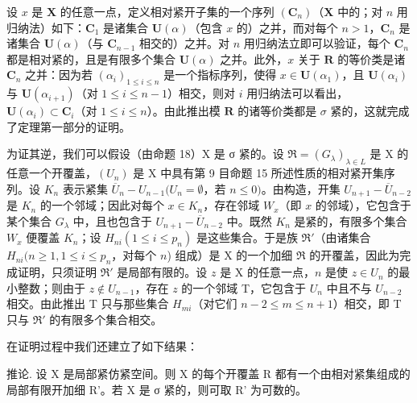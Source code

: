 设 \(x\) 是 \(\mathbf{X}\) 的任意一点，定义相对紧开子集的一个序列 \((\mathbf{C}_n)\)（\(\mathbf{X}\) 中的；对 \(n\) 用归纳法）如下：\(\mathbf{C}_1\) 是诸集合 \(\mathbf{U}(\alpha)\)（包含 \(x\) 的）之并，而对每个 \(n > 1\)，\(\mathbf{C}_n\) 是诸集合 \(\mathbf{U}(\alpha)\)（与 \(\mathbf{C}_{n-1}\) 相交的）之并。对 \(n\) 用归纳法立即可以验证，每个 \(\mathbf{C}_n\) 都是相对紧的，且是有限多个集合 \(\mathbf{U}(\alpha)\) 之并。此外，\(x\) 关于 \(\mathbf{R}\) 的等价类是诸 \(\mathbf{C}_n\) 之并：因为若 \((\alpha_i)_{1 \leqslant i \leqslant n}\) 是一个指标序列，使得 \(x \in \mathbf{U}(\alpha_1)\)，且 \(\mathbf{U}(\alpha_i)\) 与 \(\mathbf{U}(\alpha_{i+1})\)（对 \(1 \leqslant i \leqslant n - 1\)）相交，则对 \(i\) 用归纳法可以看出，\(\mathbf{U}(\alpha_i) \subset \mathbf{C}_i\)（对 \(1 \leqslant i \leqslant n\)）。由此推出模 \(\mathbf{R}\) 的诸等价类都是 \(\sigma\) 紧的，这就完成了定理第一部分的证明。

为证其逆，我们可以假设（由命题 18）X 是 σ 紧的。设 \(\Re = (G_{\lambda})_{\lambda \in L}\) 是 X 的任意一个开覆盖，\((U_n)\) 是 X 中具有第 9 目命题 15 所述性质的相对紧开集序列。设 \(K_n\) 表示紧集 \(\overline{U}_n - U_{n-1}(U_n = \emptyset\)，若 \(n \leqslant 0)\)。由构造，开集 \(U_{n+1} - \overline{U}_{n-2}\) 是 \(K_n\) 的一个邻域；因此对每个 \(x \in K_n\)，存在邻域 \(W_x\)（即 \(x\) 的邻域），它包含于某个集合 \(G_{\lambda}\) 中，且也包含于 \(U_{n+1} - \overline{U}_{n-2}\) 中。既然 \(K_n\) 是紧的，有限多个集合 \(W_x\) 便覆盖 \(K_n\)；设 \(H_{ni}(1 \leqslant i \leqslant p_n)\) 是这些集合。于是族 \(\Re'\)（由诸集合 \(H_{ni}(n \geqslant 1, 1 \leqslant i \leqslant p_n\)，对每个 \(n\)) 组成）是 X 的一个加细 \(\Re\) 的开覆盖，因此为完成证明，只须证明 \(\Re'\) 是局部有限的。设 \(z\) 是 X 的任意一点，\(n\) 是使 \(z \in U_n\) 的最小整数；则由于 \(z \notin U_{n-1}\)，存在 \(z\) 的一个邻域 T，它包含于 \(U_n\) 中且不与 \(U_{n-2}\) 相交。由此推出 T 只与那些集合 \(H_{mi}\)（对它们 \(n - 2 \leqslant m \leqslant n + 1\)）相交，即 T 只与 \(\Re'\) 的有限多个集合相交。

在证明过程中我们还建立了如下结果：

推论. 设 X 是局部紧仿紧空间。则 X 的每个开覆盖 R 都有一个由相对紧集组成的局部有限开加细 R'。若 X 是 σ 紧的，则可取 R' 为可数的。

